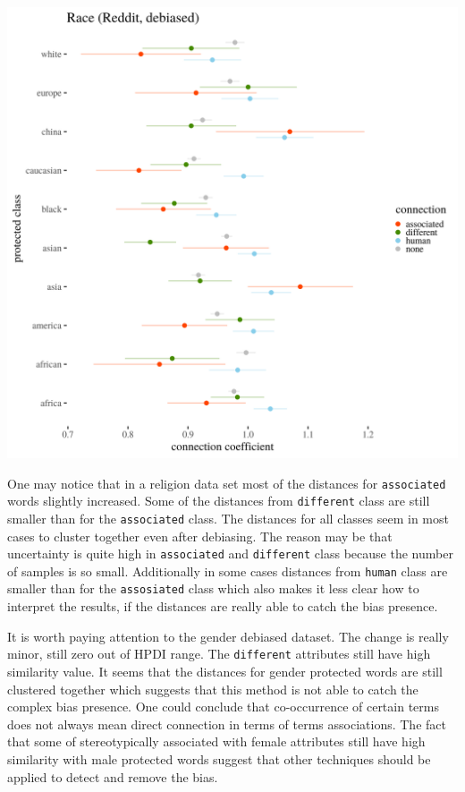 \documentclass[
  12pt,
]{book}
\begin{document}
\includegraphics[width=14cm]{../images/visDebRaceReddit.png}

One may notice that in a religion data set most of the distances for \texttt{associated} words slightly increased. Some of the distances from \texttt{different} class are still smaller than for the \texttt{associated} class. The distances for all classes seem in most cases to cluster together even after debiasing. The reason may be that uncertainty is quite high in \texttt{associated} and \texttt{different} class because the number of samples is so small. Additionally in some cases distances from \texttt{human} class are smaller than for the \texttt{assosiated} class which also makes it less clear how to interpret the results, if the distances are really able to catch the bias presence.

It is worth paying attention to the gender debiased dataset. The change is really minor, still zero out of HPDI range. The \texttt{different} attributes still have high similarity value. It seems that the distances for gender protected words are still clustered together which suggests that this method is not able to catch the complex bias presence. One could conclude that co-occurrence of certain terms does not always mean direct connection in terms of terms associations. The fact that some of stereotypically associated with female attributes still have high similarity with male protected words suggest that other techniques should be applied to detect and remove the bias.
\end{document}
